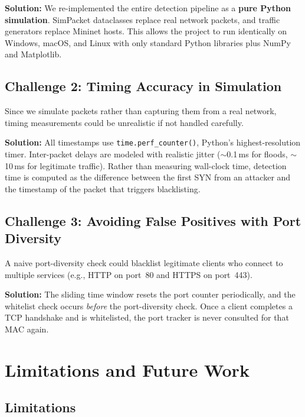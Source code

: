 \documentclass[12pt, a4paper]{article}
\begin{document}
\textbf{Solution:} We re-implemented the entire detection pipeline as a \textbf{pure Python simulation}. SimPacket dataclasses replace real network packets, and traffic generators replace Mininet hosts. This allows the project to run identically on Windows, macOS, and Linux with only standard Python libraries plus NumPy and Matplotlib.

\subsection{Challenge 2: Timing Accuracy in Simulation}

Since we simulate packets rather than capturing them from a real network, timing measurements could be unrealistic if not handled carefully.

\textbf{Solution:} All timestamps use \texttt{time.perf\_counter()}, Python's highest-resolution timer. Inter-packet delays are modeled with realistic jitter ($\sim$0.1\,ms for floods, $\sim$10\,ms for legitimate traffic). Rather than measuring wall-clock time, detection time is computed as the difference between the first SYN from an attacker and the timestamp of the packet that triggers blacklisting.

\subsection{Challenge 3: Avoiding False Positives with Port Diversity}

A naive port-diversity check could blacklist legitimate clients who connect to multiple services (e.g., HTTP on port~80 and HTTPS on port~443).

\textbf{Solution:} The sliding time window resets the port counter periodically, and the whitelist check occurs \textit{before} the port-diversity check. Once a client completes a TCP handshake and is whitelisted, the port tracker is never consulted for that MAC again.

\newpage

\section{Limitations and Future Work}

\subsection{Limitations}
\end{document}
